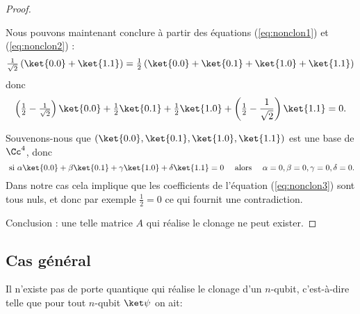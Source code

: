 \documentclass[11pt,class=report,crop=false]{standalone}
\begin{document}
\begin{proof}
\begin{itemize}
\end{itemize}

Nous pouvons maintenant conclure à partir des équations (\ref{eq:nonclon1}) et (\ref{eq:nonclon2}) :
$$\tfrac1{\sqrt2} \left(\ket{0.0} + \ket{1.1} \right) 
= \tfrac12 \left( \ket{0.0} + \ket{0.1} + \ket{1.0} + \ket{1.1} \right)$$
donc
\begin{equation}
\label{eq:nonclon3}
\left(\tfrac12-\tfrac1{\sqrt2}\right) \ket{0.0} + \tfrac12\ket{0.1} + \tfrac12\ket{1.0} + \left(\tfrac12-\frac1{\sqrt2}\right)\ket{1.1} = 0.
\end{equation}

Souvenons-nous que $(\ket{0.0},\ket{0.1},\ket{1.0},\ket{1.1})$ est une base de $\Cc^4$,
donc
$$\text{ si } \alpha\ket{0.0} + \beta \ket{0.1} +\gamma\ket{1.0} +\delta\ket{1.1}=0
\quad\text{ alors }\quad \alpha=0, \beta=0, \gamma= 0, \delta=0.$$
Dans notre cas cela implique que les coefficients de l'équation (\ref{eq:nonclon3}) sont tous nuls, et donc par exemple $\frac12=0$ ce qui fournit une contradiction.

Conclusion : une telle matrice $A$ qui réalise le clonage ne peut exister.
\end{proof}
\subsection{Cas général}


\begin{theoreme}%
Il n'existe pas de porte quantique qui réalise le clonage d'un $n$-qubit, c'est-à-dire telle que pour tout $n$-qubit $\ket\psi$ on ait:
\end{theoreme}

\end{document}
